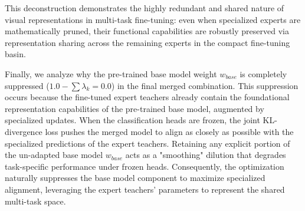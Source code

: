 This deconstruction demonstrates the highly redundant and shared nature of visual representations in multi-task fine-tuning: even when specialized experts are mathematically pruned, their functional capabilities are robustly preserved via representation sharing across the remaining experts in the compact fine-tuning basin.

Finally, we analyze why the pre-trained base model weight $w_{base}$ is completely suppressed ($1.0 - \sum \lambda_k = 0.0$) in the final merged combination. This suppression occurs because the fine-tuned expert teachers already contain the foundational representation capabilities of the pre-trained base model, augmented by specialized updates. When the classification heads are frozen, the joint KL-divergence loss pushes the merged model to align as closely as possible with the specialized predictions of the expert teachers. Retaining any explicit portion of the un-adapted base model $w_{base}$ acts as a "smoothing" dilution that degrades task-specific performance under frozen heads. Consequently, the optimization naturally suppresses the base model component to maximize specialized alignment, leveraging the expert teachers' parameters to represent the shared multi-task space.
